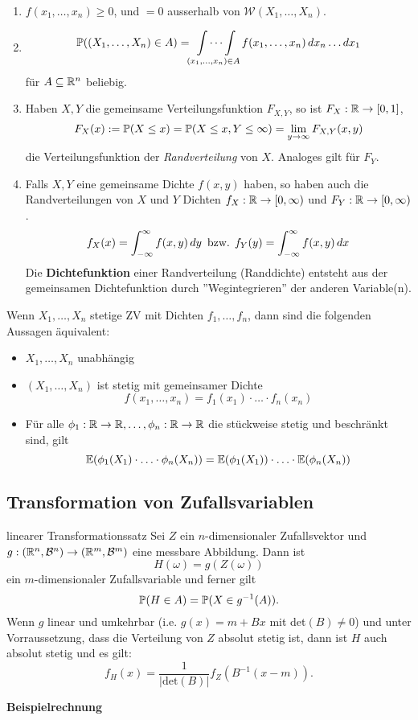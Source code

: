 \begin{enumerate}
    \item $f(x_1, \ldots, x_n) \geq 0$, und $ = 0$ ausserhalb von $\mathcal{W}(X_1, \ldots, X_n)$.
    \item 
    \begin{gather*}
        \P((X_1, \ldots, X_n) \in A) = \idotsint\limits_{(x_1, \ldots, x_n) \in A} f(x_1, \ldots, x_n) \mathop{dx_n}\ldots\mathop{dx_1}
    \end{gather*}
    für $A \subseteq \R^n$ beliebig.
    \item Haben $X, Y$ die gemeinsame Verteilungsfunktion $F_{X,Y}$, so ist $F_X: \R \to [0,1]$,
    $$F_X(x) := \P(X \leq x) = \P(X \leq x, Y \leq \infty) = \lim_{y \to \infty}F_{X,Y}(x,y)$$
    die Verteilungsfunktion der \textit{Randverteilung} von $X$. Analoges gilt für $F_Y$.
    \item Falls $X,Y$ eine gemeinsame Dichte $f(x,y)$ haben, so haben auch die Randverteilungen von $X$ und $Y$ Dichten $f_X: \R \to [0, \infty)$ und $F_Y: \R \to [0, \infty)$.
    $$f_X(x) = \int_{-\infty}^{\infty}f(x,y)\mathop{dy} \text{ bzw. } f_Y(y)=\int_{-\infty}^{\infty}f(x,y)\dx$$
    Die \textbf{Dichtefunktion} einer Randverteilung (Randdichte) entsteht aus der gemeinsamen Dichtefunktion durch ''Wegintegrieren'' der anderen Variable(n).
\end{enumerate}
Wenn $X_1, \ldots, X_n$ stetige ZV mit Dichten $f_1, \ldots, f_n$, dann sind die folgenden Aussagen äquivalent:
\begin{itemize}
    \item $X_1, \ldots, X_n$ unabhängig
    \item $(X_1, \ldots, X_n)$ ist stetig mit gemeinsamer Dichte $$f(x_1, \ldots, x_n) = f_1(x_1) \cdot \ldots \cdot f_n(x_n)$$
    \item Für alle $\phi_1: \R \to \R, \ldots, \phi_n: \R \to \R$ die stückweise stetig und beschränkt sind, gilt 
    $$\E(\phi_1(X_1)\cdot \ldots \cdot \phi_n(X_n)) = \E(\phi_1(X_1)) \cdot \ldots \cdot \E(\phi_n(X_n))$$
\end{itemize}
\subsection{Transformation von Zufallsvariablen}
\begin{subbox}{linearer Transformationssatz}
    Sei $Z$ ein $n$-dimensionaler Zufallsvektor und $g: (\R^n, \mathcal{B}^n) \to (\R^m, \mathcal{B}^m)$ eine messbare Abbildung. Dann ist
    $$H(\omega) = g(Z(\omega))$$
    ein $m$-dimensionaler Zufallsvariable und ferner gilt
    $$\P(H \in A) = \P(X \in g^{-1}(A)).$$
    Wenn $g$ linear und umkehrbar (i.e. $g(x) = m + Bx$ mit det$(B) \neq 0$) und unter Vorraussetzung, dass die Verteilung von $Z$ absolut stetig ist, dann ist $H$ auch absolut stetig und es gilt:
    $$f_H(x)=\frac{1}{|\text{det}(B)|}f_Z(B^{-1}(x-m)).$$
\end{subbox}
\textbf{Beispielrechnung}

